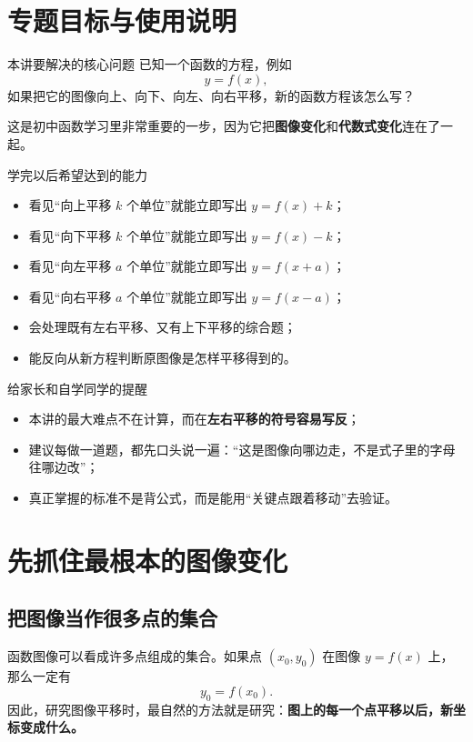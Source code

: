\documentclass[11pt,a4paper,fontset=fandol]{ctexart}
\theoremstyle{formaltheorem}
\theoremstyle{formalexample}
\newcommand{\basef}{y=f(x)}
\begin{document}
\pagestyle{plain}
\tableofcontents
\newpage
\pagestyle{fancy}

\section{专题目标与使用说明}

\begin{goalbox}{本讲要解决的核心问题}
已知一个函数的方程，例如
\[
y=f(x),
\]
如果把它的图像向上、向下、向左、向右平移，新的函数方程该怎么写？

这是初中函数学习里非常重要的一步，因为它把\textbf{图像变化}和\textbf{代数式变化}连在了一起。
\end{goalbox}

\begin{goalbox}{学完以后希望达到的能力}
\begin{itemize}
  \item 看见“向上平移 $k$ 个单位”就能立即写出 $y=f(x)+k$；
  \item 看见“向下平移 $k$ 个单位”就能立即写出 $y=f(x)-k$；
  \item 看见“向左平移 $a$ 个单位”就能立即写出 $y=f(x+a)$；
  \item 看见“向右平移 $a$ 个单位”就能立即写出 $y=f(x-a)$；
  \item 会处理既有左右平移、又有上下平移的综合题；
  \item 能反向从新方程判断原图像是怎样平移得到的。
\end{itemize}
\end{goalbox}

\begin{notebox}{给家长和自学同学的提醒}
\begin{itemize}
  \item 本讲的最大难点不在计算，而在\textbf{左右平移的符号容易写反}；
  \item 建议每做一道题，都先口头说一遍：“这是图像向哪边走，不是式子里的字母往哪边改”；
  \item 真正掌握的标准不是背公式，而是能用“关键点跟着移动”去验证。
\end{itemize}
\end{notebox}

\section{先抓住最根本的图像变化}

\subsection{把图像当作很多点的集合}
函数图像可以看成许多点组成的集合。如果点 $(x_0,y_0)$ 在图像 $\basef$ 上，那么一定有
\[
y_0=f(x_0).
\]
因此，研究图像平移时，最自然的方法就是研究：\textbf{图上的每一个点平移以后，新坐标变成什么。}
\end{document}
